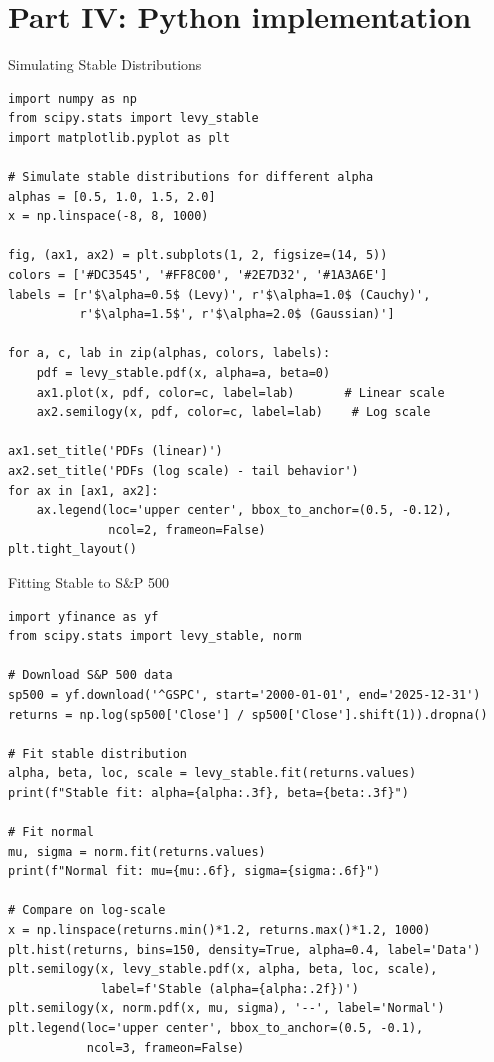 \documentclass[9pt, aspectratio=169, t]{beamer}
\begin{document}
\section{Part IV: Python implementation}

\begin{frame}[fragile]{Simulating Stable Distributions}

\begin{lstlisting}
import numpy as np
from scipy.stats import levy_stable
import matplotlib.pyplot as plt

# Simulate stable distributions for different alpha
alphas = [0.5, 1.0, 1.5, 2.0]
x = np.linspace(-8, 8, 1000)

fig, (ax1, ax2) = plt.subplots(1, 2, figsize=(14, 5))
colors = ['#DC3545', '#FF8C00', '#2E7D32', '#1A3A6E']
labels = [r'$\alpha=0.5$ (Levy)', r'$\alpha=1.0$ (Cauchy)',
          r'$\alpha=1.5$', r'$\alpha=2.0$ (Gaussian)']

for a, c, lab in zip(alphas, colors, labels):
    pdf = levy_stable.pdf(x, alpha=a, beta=0)
    ax1.plot(x, pdf, color=c, label=lab)       # Linear scale
    ax2.semilogy(x, pdf, color=c, label=lab)    # Log scale

ax1.set_title('PDFs (linear)')
ax2.set_title('PDFs (log scale) - tail behavior')
for ax in [ax1, ax2]:
    ax.legend(loc='upper center', bbox_to_anchor=(0.5, -0.12),
              ncol=2, frameon=False)
plt.tight_layout()
\end{lstlisting}
\end{frame}

\begin{frame}[fragile]{Fitting Stable to S\&P 500}

\begin{lstlisting}
import yfinance as yf
from scipy.stats import levy_stable, norm

# Download S&P 500 data
sp500 = yf.download('^GSPC', start='2000-01-01', end='2025-12-31')
returns = np.log(sp500['Close'] / sp500['Close'].shift(1)).dropna()

# Fit stable distribution
alpha, beta, loc, scale = levy_stable.fit(returns.values)
print(f"Stable fit: alpha={alpha:.3f}, beta={beta:.3f}")

# Fit normal
mu, sigma = norm.fit(returns.values)
print(f"Normal fit: mu={mu:.6f}, sigma={sigma:.6f}")

# Compare on log-scale
x = np.linspace(returns.min()*1.2, returns.max()*1.2, 1000)
plt.hist(returns, bins=150, density=True, alpha=0.4, label='Data')
plt.semilogy(x, levy_stable.pdf(x, alpha, beta, loc, scale),
             label=f'Stable (alpha={alpha:.2f})')
plt.semilogy(x, norm.pdf(x, mu, sigma), '--', label='Normal')
plt.legend(loc='upper center', bbox_to_anchor=(0.5, -0.1),
           ncol=3, frameon=False)
\end{lstlisting}
\end{frame}
\end{document}
